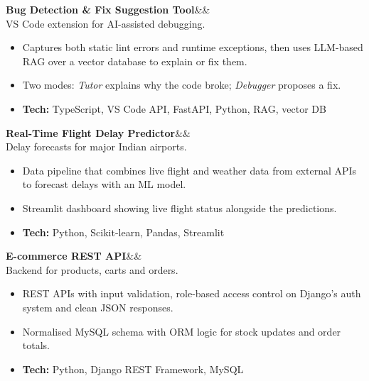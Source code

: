 \documentclass[10pt,a4paper]{article}
\newcommand{\project}[3]{%
  \textbf{#1}\ifx&#3&\else\hfill{\small\href{https://#3}{#3}}\fi\\
  {\color{muted}\small #2}\par\vspace{1pt}}
\newcommand{\tech}[1]{{\small\textbf{Tech:} #1}}
\begin{document}
\project{Bug Detection \& Fix Suggestion Tool}{VS Code extension for AI-assisted debugging.}{}
\begin{itemize}
  \item Captures both static lint errors and runtime exceptions, then uses LLM-based RAG over a vector database to explain or fix them.
  \item Two modes: \textit{Tutor} explains why the code broke; \textit{Debugger} proposes a fix.
  \item \tech{TypeScript, VS Code API, FastAPI, Python, RAG, vector DB}
\end{itemize}
\vspace{4pt}

\project{Real-Time Flight Delay Predictor}{Delay forecasts for major Indian airports.}{}
\begin{itemize}
  \item Data pipeline that combines live flight and weather data from external APIs to forecast delays with an ML model.
  \item Streamlit dashboard showing live flight status alongside the predictions.
  \item \tech{Python, Scikit-learn, Pandas, Streamlit}
\end{itemize}
\vspace{4pt}

\project{E-commerce REST API}{Backend for products, carts and orders.}{}
\begin{itemize}
  \item REST APIs with input validation, role-based access control on Django's auth system and clean JSON responses.
  \item Normalised MySQL schema with ORM logic for stock updates and order totals.
  \item \tech{Python, Django REST Framework, MySQL}
\end{itemize}

\end{document}
